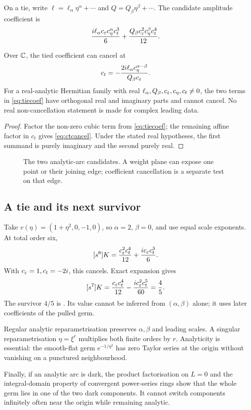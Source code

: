 On a tie, write \(\ell=\ell_\alpha\eta^\alpha+\cdots\) and
\(Q=Q_\beta\eta^\beta+\cdots\).  The candidate amplitude coefficient is
\begin{equation}\label{eq:tiecoef}
\frac{i\ell_\alpha c_\varepsilon c_\eta^\alpha c_t^3}{6}
+\frac{Q_\beta c_\varepsilon^2c_\eta^\beta c_t^4}{12}.
\end{equation}

\begin{proposition}\label{prop:tiefield}
Over \(\mathbb C\), the tied coefficient can cancel at
\begin{equation}\label{eq:ctcancel}
c_t=-\frac{2i\ell_\alpha c_\eta^{\alpha-\beta}}{Q_\beta c_\varepsilon}.
\end{equation}
For a real-analytic Hermitian family with real
\(\ell_\alpha,Q_\beta,c_\varepsilon,c_\eta,c_t\ne0\), the two terms in
\cref{eq:tiecoef} have orthogonal real and imaginary parts and cannot cancel.
No real non-cancellation statement is made for complex leading data.
\end{proposition}
\begin{proof}
Factor the non-zero cubic term from \cref{eq:tiecoef}; the remaining affine
factor in \(c_t\) gives \cref{eq:ctcancel}.  Under the stated real hypotheses,
the first summand is purely imaginary and the second purely real.
\end{proof}

\begin{figure}[ht]
\centering
\caption{The two analytic-arc candidates.  A weight plane can expose one point
or their joining edge; coefficient cancellation is a separate test on that
edge.}
\label{fig:arclower}
\end{figure}

\subsection{A tie and its next survivor}

Take \(v(\eta)=(1+\eta^2,0,-1,0)\), so \(\alpha=2\), \(\beta=0\), and use
equal scale exponents.  At total order six,
\[
[s^6]K=\frac{c_\varepsilon^2c_t^4}{12}+\frac{i c_\varepsilon c_t^3}{6}.
\]
With \(c_\varepsilon=1,c_t=-2i\), this cancels.  Exact expansion gives
\[
[s^7]K=\frac{c_\varepsilon c_t^4}{12}-\frac{i c_\varepsilon^2c_t^5}{60}=\frac45.
\]
The survivor \(4/5\) is .  Its value cannot be inferred
from \((\alpha,\beta)\) alone; it uses later coefficients of the pulled germ.

Regular analytic reparametrisation preserves \(\alpha,\beta\) and leading
scales.  A singular reparametrisation \(\eta=\xi^r\) multiplies both finite
orders by \(r\).  Analyticity is essential: the smooth-flat germ
\(e^{-1/\eta^2}\) has zero Taylor series at the origin without vanishing on a
punctured neighbourhood.

Finally, if an analytic arc is dark, the product factorisation on \(L=0\) and
the integral-domain property of convergent power-series rings show that the
whole germ lies in one of the two dark components.  It cannot switch components
infinitely often near the origin while remaining analytic.
